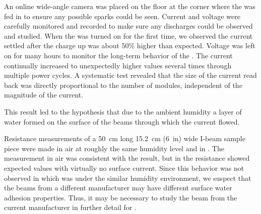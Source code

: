 An online wide-angle camera was placed on the floor at the corner where the  was fed in to ensure any possible sparks could be seen.
Current and voltage were carefully monitored and recorded to make sure any discharges could be observed and studied.
When the  was turned on for the first time, we observed the current settled after the charge up was about \num{50}\% higher than expected.
Voltage was left on for many hours to monitor the long-term behavior of the .
The current continually increased to unexpectedly higher values several times %
through multiple power cycles.
A systematic test revealed that the size of the current read back was directly proportional to the number of  modules, independent of the magnitude of the current.

This %
result led to the hypothesis that due to the ambient humidity %
a layer of water %
formed on the surface of the  beams  through which %
the current flowed. %

Resistance measurements of a \SI{50}{\cm} long \SI{15.2}{\cm} (\SI{6}{in}) wide I-beam sample piece were made in air at roughly the same humidity level and in . The measurement in air was consistent with the   result,  but in  the resistance showed expected values with virtually no surface current. 
Since this behavior was not observed in   which was under the similar humidity environment, we suspect that the  beams from a different manufacturer may have different surface water adhesion properties. Thus, it may be necessary to study the  beam from the current manufacturer in further detail for \dual {}.


